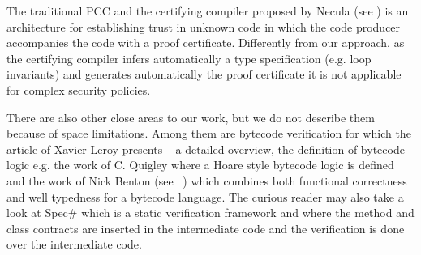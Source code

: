 
 The traditional PCC and the certifying compiler proposed by Necula (see \cite{ComNec,DesNecLee98}) is an architecture for 
 establishing trust in unknown code in which the code producer accompanies the code with a proof certificate. Differently from our approach,
  as the certifying compiler infers automatically a type specification (e.g. loop invariants) and generates automatically the proof certificate
  it is not applicable for complex security policies.

There are also other close areas to our work, but we do not describe them because of space limitations.
Among them are bytecode verification for which the article of Xavier Leroy presents ~\cite{Ljbc} a detailed overview, 
the definition of bytecode logic e.g. the work of C. Quigley \cite{Quigley} where a Hoare style bytecode logic is defined and
the work of Nick Benton (see ~\cite{B04tlsj}) which combines both functional correctness and well typedness for a bytecode language. 
The curious reader may also take a look at Spec\# \cite{BLS04sp} which is a static verification framework and
 where the method and class contracts are inserted in the intermediate code and the verification is done over the intermediate code. 



 
